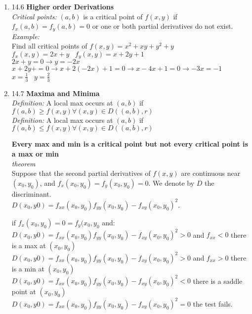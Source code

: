 \documentclass[11pt]{article}
\newenvironment{proof}{{\bf Proof:  }}{\hfill\rule{2mm}{2mm}}
\begin{document}
\begin{enumerate}
\begin{proof}
     
     \end{proof}





\item 14.6 \textbf{Higher order Derivations}
\\
\textit{Critical points:}
$(a,b)$ is a critical point of $f(x,y)$ if $f_x(a,b)=f_y(a,b)=0$ or one or both partial derivatives do not exist.
\\
\textit{Example:}
\\
Find all critical points of $f(x,y)=x^2+xy+y^2+y$
\\
$f_x(x,y)=2x+y \; \; \; f_y(x,y)=x+2y+1$
\\
$2x+y=0 \rightarrow y=-2x$
\\
$x+2y+=0 \rightarrow x+2(-2x)+1=0 \rightarrow x-4x+1=0 \rightarrow -3x=-1$
\\
$x=\frac{1}{3} \; \; \; y=\frac{2}{3}$






\item 14.7 \textbf{Maxima and Minima}
\\
\textit{Definition:}
A local max occurs at $(a,b)$ if $f(a,b) \ge f(x,y) \forall (x,y) \in D ((a,b),r)$
\\
\textit{Definition:}
A local max occurs at $(a,b)$ if $f(a,b) \le f(x,y) \forall (x,y) \in D ((a,b),r)$

\textbf{Every max and min is a critical point but not every critical point is a max or min}
\\
\textit{theorem}
\\
Suppose that the second partial derivatives of $f(x,y)$ are continuous near $(x_0,y_0)$, and $f_x(x_0,y_0)=f_y(x_0,y_0)=0$. We denote by $D$ the discriminant.
\\
$D(x_0,y0)=f_{xx}(x_0,y_0)f_{yy}(x_0,y_0)-f_{xy}(x_0,y_0)^2$.
\begin{center}
if $f_x(x_0,y_0)=0=f_y(x_0,y_0$ and:
\\
$D(x_0,y0)=f_{xx}(x_0,y_0)f_{yy}(x_0,y_0)-f_{xy}(x_0,y_0)^2 > 0$ and $f_{xx}<0$ there is a max at $(x_0,y_0)$
\\
$D(x_0,y0)=f_{xx}(x_0,y_0)f_{yy}(x_0,y_0)-f_{xy}(x_0,y_0)^2 > 0$ and $f_{xx}>0$ there is a min at $(x_0,y_0)$
\\
$D(x_0,y0)=f_{xx}(x_0,y_0)f_{yy}(x_0,y_0)-f_{xy}(x_0,y_0)^2 < 0$ there is a saddle point at $(x_0,y_0)$
\\
$D(x_0,y0)=f_{xx}(x_0,y_0)f_{yy}(x_0,y_0)-f_{xy}(x_0,y_0)^2 = 0$ the test fails.





\end{center}
\end{enumerate}
\end{document}
